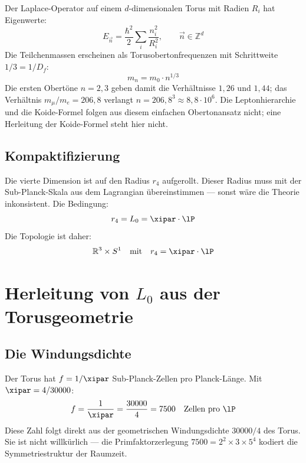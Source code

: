 Der Laplace-Operator auf einem $d$-dimensionalen Torus mit Radien $R_i$ hat Eigenwerte:
\begin{equation}
	E_{\vec{n}} = \frac{\hbar^2}{2} \sum_i \frac{n_i^2}{R_i^2}, \qquad \vec{n} \in \mathbb{Z}^d
\end{equation}
Die Teilchenmassen erscheinen als Torusobertonfrequenzen mit Schrittweite $1/3 = 1/D_f$:
\begin{equation}
	m_n = m_0 \cdot n^{1/3}
\end{equation}
Die ersten Obertöne $n = 2, 3$ geben damit die Verhältnisse $1{,}26$ und $1{,}44$; das Verhältnis $m_\mu/m_e = 206{,}8$ verlangt $n = 206{,}8^3 \approx 8{,}8\cdot 10^6$. Die Leptonhierarchie und die Koide-Formel folgen aus diesem einfachen Obertonansatz nicht; eine Herleitung der Koide-Formel steht hier nicht.

\subsection{Kompaktifizierung}

Die vierte Dimension ist auf den Radius $r_4$ aufgerollt. Dieser Radius muss mit der Sub-Planck-Skala aus dem Lagrangian übereinstimmen — sonst wäre die Theorie inkonsistent. Die Bedingung:
\begin{equation}
	r_4 = L_0 = \xipar \cdot \lP
\end{equation}
Die Topologie ist daher:
\begin{equation}
	\mathbb{R}^3 \times S^1 \quad \text{mit} \quad r_4 = \xipar \cdot \lP
\end{equation}

\section{Herleitung von \texorpdfstring{$L_0$}{L0} aus der Torusgeometrie}

\subsection{Die Windungsdichte}

Der Torus hat $f = 1/\xipar$ Sub-Planck-Zellen pro Planck-Länge. Mit $\xipar = 4/30000$:
\begin{equation}
	f = \frac{1}{\xipar} = \frac{30000}{4} = 7500 \quad \text{Zellen pro } \lP
\end{equation}
Diese Zahl folgt direkt aus der geometrischen Windungsdichte $30000/4$ des Torus. Sie ist nicht willkürlich — die Primfaktorzerlegung $7500 = 2^2 \times 3 \times 5^4$ kodiert die Symmetriestruktur der Raumzeit.


